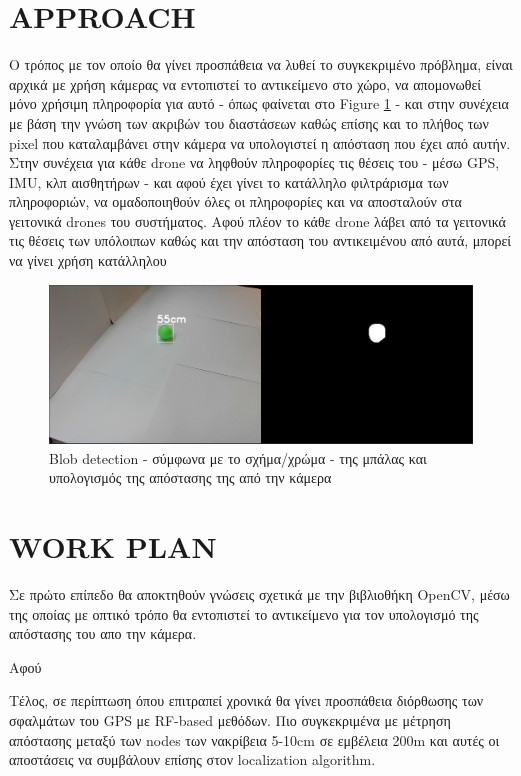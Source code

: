 \section{APPROACH}
Ο τρόπος με τον οποίο θα γίνει προσπάθεια να λυθεί το συγκεκριμένο πρόβλημα, είναι αρχικά με χρήση 
κάμερας να εντοπιστεί το αντικείμενο στο χώρο, να απομονωθεί μόνο χρήσιμη πληροφορία για αυτό   
- όπως φαίνεται στο Figure \ref{fig:2} - και στην συνέχεια με βάση την γνώση των ακριβών του διαστάσεων
καθώς επίσης και το πλήθος των pixel που καταλαμβάνει στην κάμερα να υπολογιστεί η απόσταση που έχει από 
αυτήν. Στην συνέχεια για κάθε drone να ληφθούν πληροφορίες τις θέσεις του - μέσω GPS, IMU, κλπ αισθητήρων -
και αφού έχει γίνει το κατάλληλο φιλτράρισμα των πληροφοριών, να ομαδοποιηθούν όλες οι πληροφορίες και 
να αποσταλούν στα γειτονικά drones του συστήματος. Αφού πλέον το κάθε drone λάβει από τα γειτονικά τις 
θέσεις των υπόλοιπων καθώς και την απόσταση του αντικειμένου από αυτά, μπορεί να γίνει χρήση κατάλληλου



\begin{figure}[thpb]
  \centering
  \includegraphics[width=\linewidth]{Images/Thesis-Proposal-shape-color-detection.png}
  \caption{Blob detection - σύμφωνα με το σχήμα/χρώμα - της μπάλας και υπολογισμός της απόστασης της από την κάμερα}
  \label{fig:2}
\end{figure}

\section{WORK PLAN}
Σε πρώτο επίπεδο θα αποκτηθούν γνώσεις σχετικά με την βιβλιοθήκη OpenCV, μέσω της οποίας
με οπτικό τρόπο θα εντοπιστεί το αντικείμενο για τον υπολογισμό της απόστασης του απο την
κάμερα.

Αφού 

Τέλος, σε περίπτωση όπου επιτραπεί χρονικά θα γίνει προσπάθεια διόρθωσης των σφαλμάτων του 
GPS με RF-based μεθόδων. Πιο συγκεκριμένα με μέτρηση απόστασης μεταξύ των nodes των 
νακρίβεια 5-10cm σε εμβέλεια 200m και αυτές οι αποστάσεις να συμβάλουν επίσης στον localization
algorithm.




